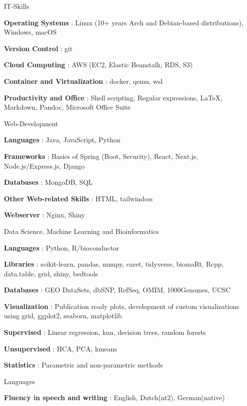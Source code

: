 \begin{cvskills}
    \cvskill
        { IT-Skills }
        {
            \begin{cvitems}
\item {\textbf{ Operating Systems }: Linux (10+ years Arch and Debian-based distributions), Windows, macOS}
\item {\textbf{ Version Control }: git}
\item {\textbf{ Cloud Computing }: AWS (EC2, Elastic Beanstalk, RDS, S3)}
\item {\textbf{ Container and Virtualization }: docker, qemu, wsl}
\item {\textbf{ Productivity and Office }: Shell scripting, Regular expressions, LaTeX, Markdown, Pandoc, Microsoft Office Suite}
            \end{cvitems}
        }
    \cvskill
        { Web-Development }
        {
            \begin{cvitems}
\item {\textbf{ Languages }: Java, JavaScript, Python}
\item {\textbf{ Frameworks }: Basics of Spring (Boot, Security), React, Next.js, Node.js/Express.js, Django}
\item {\textbf{ Databases }: MongoDB, SQL}
\item {\textbf{ Other Web-related Skills }: HTML, tailwindcss}
\item {\textbf{ Webserver }: Nginx, Shiny}
            \end{cvitems}
        }
    \cvskill
        { Data Science, Machine Learning and Bioinformatics }
        {
            \begin{cvitems}
\item {\textbf{ Languages }: Python, R/bioconductor}
\item {\textbf{ Libraries }: scikit-learn, pandas, numpy, caret, tidyverse, biomaRt, Rcpp, data.table, grid, shiny, bedtools}
\item {\textbf{ Databases }: GEO DataSets, dbSNP, RefSeq, OMIM, 1000Genomes, UCSC}
\item {\textbf{ Visualization }: Publication ready plots, development of custom visualizations using grid, ggplot2, seaborn, matplotlib}
\item {\textbf{ Supervised }: Linear regression, knn, decision trees, random forests}
\item {\textbf{ Unsupervised }: HCA, PCA, kmeans}
\item {\textbf{ Statistics }: Parametric and non-parametric methods}
            \end{cvitems}
        }
    \cvskill
        { Languages }
        {
            \begin{cvitems}
\item {\textbf{ Fluency in speech and writing }: English, Dutch(nt2), German(native)}
            \end{cvitems}
        }
\end{cvskills}